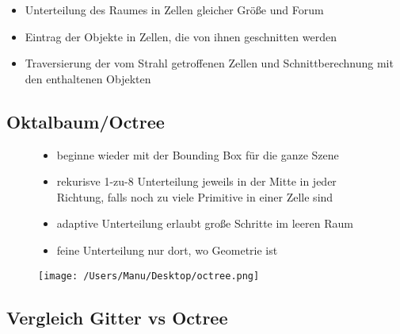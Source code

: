 \documentclass[paper=a4, fontsize=11pt]{scrartcl} %
\numberwithin{equation}{section} %
\numberwithin{figure}{section} %
\numberwithin{table}{section} %
\begin{document}
\begin{itemize}
\item Unterteilung des Raumes in Zellen gleicher Größe und Forum
\item Eintrag der Objekte in Zellen, die von ihnen geschnitten werden
\item Traversierung der vom Strahl getroffenen Zellen und Schnittberechnung mit den enthaltenen Objekten
\end{itemize}

\subsection{Oktalbaum/Octree}

\begin{figure}[htbp]
\begin{minipage}[t]{6cm}
\vspace{0pt}
\begin{itemize}
\item beginne wieder mit der Bounding Box für die ganze Szene
\item rekurisve 1-zu-8 Unterteilung jeweils in der Mitte in jeder Richtung, falls noch zu viele Primitive in einer Zelle sind
\item adaptive Unterteilung erlaubt große Schritte im leeren Raum
\item feine Unterteilung nur dort, wo Geometrie ist
\end{itemize}
\end{minipage}
\hfill
\begin{minipage}[t]{6cm}
\vspace{0pt}
\centering
\texttt{[image: /Users/Manu/Desktop/octree.png]}
\end{minipage}
\end{figure}

\subsection{Vergleich Gitter vs Octree}
\end{document}
